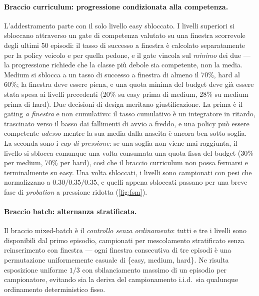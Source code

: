 \paragraph{Braccio curriculum: progressione condizionata alla competenza.}
L'addestramento parte con il solo livello easy sbloccato. I livelli
superiori si sbloccano attraverso un gate di competenza valutato su una
finestra scorrevole degli ultimi 50 episodi: il tasso di successo a
finestra è calcolato separatamente per la policy veicolo e per quella
pedone, e il gate vincola sul \emph{minimo} dei due --- la progressione
richiede che la classe più debole sia competente, non la media. Medium
si sblocca a un tasso di successo a finestra di almeno il 70\%, hard al
60\%; la finestra deve essere piena, e una quota minima del budget deve
già essere stata spesa ai livelli precedenti (20\% su easy prima di
medium, 28\% su medium prima di hard). Due decisioni di design meritano
giustificazione. La prima è il gating \emph{a finestra} e non
cumulativo: il tasso cumulativo è un integratore in ritardo, trascinato
verso il basso dai fallimenti di avvio a freddo, e una policy può essere
competente \emph{adesso} mentre la sua media dalla nascita è ancora ben
sotto soglia. La seconda sono i \emph{cap di pressione}: se una soglia
non viene mai raggiunta, il livello si sblocca comunque una volta
consumata una quota fissa del budget (30\% per medium, 70\% per hard),
così che il braccio curriculum non possa fermarsi e terminalmente su easy.
Una volta sbloccati, i livelli sono campionati con pesi che normalizzano
a $0.30/0.35/0.35$, e quelli appena sbloccati passano per una breve fase
di \emph{probation} a pressione ridotta (\cref{fig:fsm}).

\paragraph{Braccio batch: alternanza stratificata.}
Il braccio mixed-batch è il \emph{controllo senza ordinamento}: tutti e
tre i livelli sono disponibili dal primo episodio, campionati per
mescolamento stratificato senza reinserimento con finestra --- ogni
finestra consecutiva di tre episodi è una permutazione uniformemente
casuale di \{easy, medium, hard\}. Ne risulta esposizione uniforme
$1/3$ con sbilanciamento massimo di un episodio per campionatore,
evitando sia la deriva del campionamento i.i.d.\ sia qualunque
ordinamento deterministico fisso.


